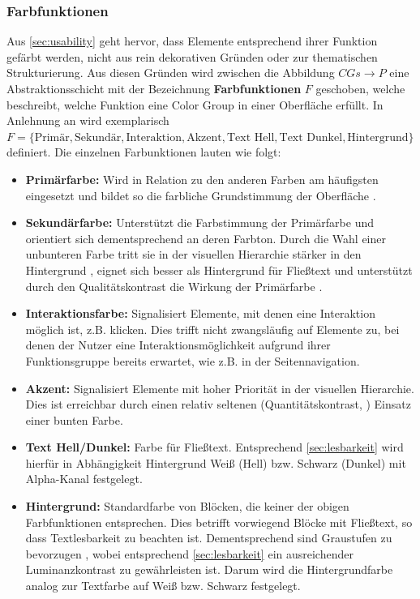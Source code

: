 \subsubsection{Farbfunktionen}
Aus \autoref{sec:usability} geht hervor, dass Elemente entsprechend ihrer Funktion gefärbt werden, nicht aus rein dekorativen Gründen oder zur thematischen Strukturierung. Aus diesen Gründen wird zwischen die Abbildung $CGs \to P$ eine Abstraktionsschicht mit der Bezeichnung \textbf{Farbfunktionen} $F$ geschoben, welche beschreibt, welche Funktion eine Color Group in einer Oberfläche erfüllt. In Anlehnung an \citep{google,  smashing} wird exemplarisch $F = \{\text{Primär}, \text{Sekundär}, \text{Interaktion}, \text{Akzent}, \text{Text Hell}, \text{Text Dunkel}, \text{Hintergrund}\}$ definiert. Die einzelnen Farbunktionen lauten wie folgt:
\begin{itemize}
	\item \textbf{Primärfarbe:} Wird in Relation zu den anderen Farben am häufigsten eingesetzt und bildet so die farbliche Grundstimmung der Oberfläche \citep{awwwards}.
	\item \textbf{Sekundärfarbe:} Unterstützt die Farbstimmung der Primärfarbe und orientiert sich dementsprechend an deren Farbton. Durch die Wahl einer unbunteren Farbe tritt sie in der visuellen Hierarchie stärker in den Hintergrund \citep{visual-hierarchy}, eignet sich besser als Hintergrund für Fließtext und unterstützt durch den Qualitätskontrast die Wirkung der Primärfarbe \citep{webdesign}.
	\item \textbf{Interaktionsfarbe:} Signalisiert Elemente, mit denen eine Interaktion möglich ist, z.B. klicken. Dies trifft nicht zwangsläufig auf Elemente zu, bei denen der Nutzer eine Interaktionsmöglichkeit aufgrund ihrer Funktionsgruppe bereits erwartet, wie z.B. in der Seitennavigation.
	\item \textbf{Akzent:} Signalisiert Elemente mit hoher Priorität in der visuellen Hierarchie. Dies ist erreichbar durch einen relativ seltenen (Quantitätskontrast, \citep{webdesign}) Einsatz einer bunten \citep{visual-hierarchy} Farbe.
	\item \textbf{Text Hell/Dunkel:} Farbe für Fließtext. Entsprechend \autoref{sec:lesbarkeit} wird hierfür in Abhängigkeit Hintergrund Weiß (Hell) bzw. Schwarz (Dunkel) mit Alpha-Kanal festgelegt.
	\item \textbf{Hintergrund:} Standardfarbe von Blöcken, die keiner der obigen Farbfunktionen entsprechen. Dies betrifft vorwiegend Blöcke mit Fließtext, so dass Textlesbarkeit zu beachten ist. Dementsprechend sind Graustufen zu bevorzugen \citep{webx0}, wobei entsprechend \autoref{sec:lesbarkeit} ein ausreichender Luminanzkontrast zu gewährleisten ist. Darum wird die Hintergrundfarbe analog zur Textfarbe auf Weiß bzw. Schwarz festgelegt.
\end{itemize}

